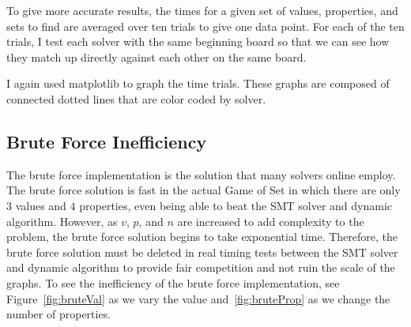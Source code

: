 \documentclass[pageno]{jpaper}
\begin{document}
To give more accurate results, the times for a given set of values, properties, and sets to find are averaged over ten trials to give one data point. For each of the ten trials, I test each solver with the same beginning board so that we can see how they match up directly against each other on the same board.

I again used matplotlib to graph the time trials. These graphs are composed of connected dotted lines that are color coded by solver. 


\subsection{Brute Force Inefficiency}

The brute force implementation is the solution that many solvers online employ. The brute force solution is fast in the actual Game of Set in which there are only $3$ values and $4$ properties, even being able to beat the SMT solver and dynamic algorithm. However, as $v$, $p$, and $n$ are increased to add complexity to the problem, the brute force solution begins to take exponential time. Therefore, the brute force solution must be deleted in real timing tests between the SMT solver and dynamic algorithm to provide fair competition and not ruin the scale of the graphs. To see the inefficiency of the brute force implementation, see Figure~\ref{fig:bruteVal} as we vary the value and~\ref{fig:bruteProp} as we change the number of properties.
\end{document}
